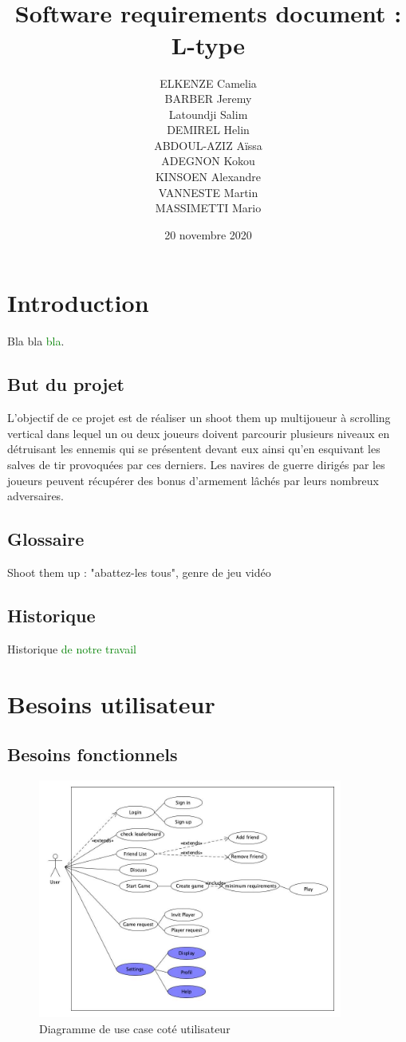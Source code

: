 \documentclass[utf8]{article}
\title{\\[3 cm]\Huge Software requirements document : \\[1 cm] L-type\\[7 cm]}
\author{ELKENZE Camelia\\[0,2 cm] BARBER Jeremy\\[0,2 cm] Latoundji Salim\\[0,2 cm] DEMIREL Helin\\[0,2 cm] ABDOUL-AZIZ Aïssa\\[0,2 cm] ADEGNON Kokou\\[0,2 cm] KINSOEN Alexandre\\[0,2 cm] VANNESTE Martin\\[0,2 cm] MASSIMETTI Mario  }
\date{20 novembre 2020}
\renewcommand*{\emph}[1]{\textcolor{green}{#1}}
\begin{document}
\tableofcontents

\newpage


\section{Introduction}
Bla bla \emph{bla}.

\subsection{But du projet}
L’objectif de ce projet est de réaliser un shoot them up multijoueur à scrolling vertical dans lequel un ou deux joueurs doivent parcourir plusieurs niveaux en détruisant les ennemis qui se présentent devant eux ainsi qu’en esquivant les salves de tir provoquées par ces derniers.
Les navires de guerre dirigés par les joueurs peuvent récupérer des bonus d’armement lâchés par leurs nombreux adversaires.

\subsection{Glossaire}
Shoot them up : "abattez-les tous", genre de jeu vidéo

\subsection{Historique}
Historique \emph{de notre travail}

\section{Besoins utilisateur}

\subsection{Besoins fonctionnels}


\begin{figure}[h!]
\centering
\includegraphics[width=10cm]{UserUseCase1}
\caption{Diagramme de use case coté utilisateur}
\label{fig:UerUseCase}
\end{figure}
\end{document}
